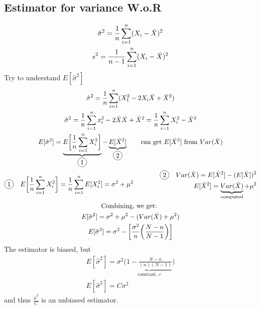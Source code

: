 \subsection*{Estimator for variance W.o.R}
\begin{gather*}
	\hat{\sigma}^2 = \frac{1}{n} \sum_{i = 1}^n (X_i - \bar{X})^2\\
	s^2 = \frac{1}{n-1} \sum_{i = 1}^n (X_i - \bar{X})^2
\end{gather*}
Try to understand $E[\hat{\sigma}^2]$
\begin{gather*}
	\hat{\sigma}^2 = \frac{1}{n} \sum_{i = 1}^n (X_1^2 -2X_i \bX + \bX^2)\\
	\hat{\sigma}^2 = \frac{1}{n}\sum\limits_{i=1}^n x_i^2 - 2\bX \bX	 + \bX^2 = \frac{1}{n}\sum\limits_{i=1}^n X_i^2 - \bX^2\\
	E[\hat{\sigma}^2] = \underbrace{E \bigg[\frac{1}{n} \sum\limits_{i=1}^n X_i^2 \bigg]}_{\circled{1}} - \underbrace{E[\bX^2]}_{\circled{2}} \qquad \text{can get $E[\bX^2]$ from $Var(\bX)$}\\
	\begin{split}
		\circled{1} \quad E \bigg[\frac{1}{n} \sum_{i=1}^n X_i^2 \bigg] = \frac{1}{n} \sum_{i=1}^n E[X_i^2] = \sigma^2 + \mu^2\\ 
	\end{split} \hspace{4em} 
	\begin{split}
	\circled{2} \quad Var(\bX) = E[\bX^2] - (E[\bX])^2\\
		E[\bX^2] = \underbrace{Var(\bX)}_{\text{computed}} + \mu^2\\
	\end{split}\\
	\text{Combining, we get: }\\
	E[\hat{\sigma}^2] = \sigma^2 + \mu^2 - (Var(\bX) + \mu^2)\\
	E[\hat{\sigma}^2] = \sigma^2 - \bigg[\frac{\sigma^2}{n} \bigg(\frac{N-n}{N-1} \bigg) \bigg]
\end{gather*}
The estimator is biased, but
\begin{gather*}
	E[\hat{\sigma}^2] = \sigma^2 \bigg(\underbrace{1 - \frac{N-n}{(n)(N-1)}}_{\text{constant, }c} \bigg)\\
	E[\hat{\sigma}^2] = C \sigma^2
\end{gather*}
and thus $\frac{\hat{\sigma}^2}{C}$ is an unbiased estimator.
